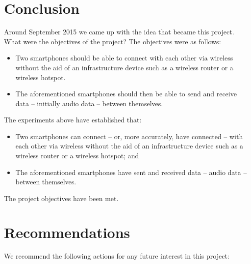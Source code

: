 \documentclass[12pt,svgnames,smaller]{article} %
\begin{document}
	\section{\textbf{Conclusion}}

	Around September 2015 we came up with the idea that became this project. What were the objectives of the project? The objectives were as follows:
	
	\begin{itemize}
		\item Two smartphones should be able to connect with each other via wireless without the aid of an infrastructure device such as a wireless router or a wireless hotspot.
		\item The aforementioned smartphones should then be able to send and receive data – initially audio data – between themselves.
	\end{itemize}
	
	The experiments above have established that:
	
	\begin{itemize}
		\item 	Two smartphones can connect – or, more accurately, have connected –  with each other via wireless without the aid of an infrastructure device such as a wireless router or a wireless hotspot; and
		\item The aforementioned smartphones have sent and received data – audio data – between themselves.
	\end{itemize}
	
	The project objectives have been met.



	\section{\textbf{Recommendations}}

	We recommend the following actions for any future interest in this project:
	
\end{document}
